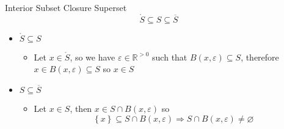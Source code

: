 \documentclass{standalone}
\begin{document}
\begin{theo*}{Interior Subset Closure Superset}
  \[
    \mathring{S} \subseteq S \subseteq \overline{S}
  \]
  \begin{pf}
    \begin{itemize}
      \item $\mathring{S} \subseteq S$ 
        \begin{itemize}
          \item Let $x \in \mathring{S}$, so we have $\varepsilon \in \mathbb{R} ^{>0}$ such that $B\left(x, \varepsilon\right) \subseteq S$, therefore $x \in B\left(x, \varepsilon\right) \subseteq S$ so $x \in S$ 
        \end{itemize}
      \item $S \subseteq \overline{S}$ 
        \begin{itemize}
          \item Let $x \in S$, then $x \in S \cap B\left(x, \varepsilon\right)$ so 
            \[
            \left\{ x \right\} \subseteq S \cap B\left(x, \varepsilon \right) \Rightarrow S \cap B\left(x, \varepsilon \right) \neq \varnothing
            \]
        \end{itemize}
    \end{itemize}
  \end{pf}
\end{theo*}
\end{document}
